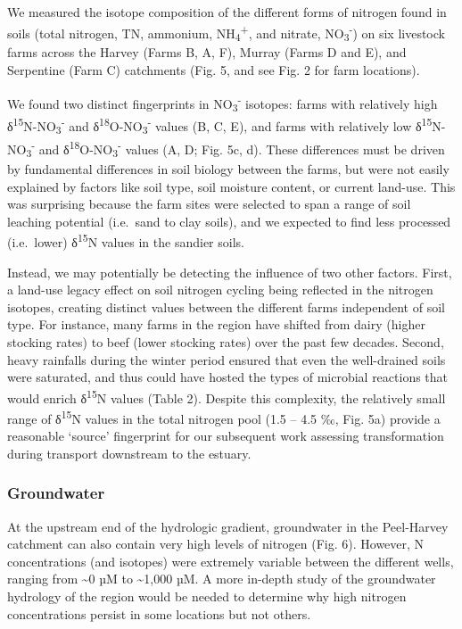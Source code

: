 \documentclass[
]{book}
\begin{document}
We measured the isotope composition of the different forms of nitrogen found in soils (total nitrogen, TN, ammonium, NH\textsubscript{4}\textsuperscript{+}, and nitrate, NO\textsubscript{3}\textsuperscript{-}) on six livestock farms across the Harvey (Farms B, A, F), Murray (Farms D and E), and Serpentine (Farm C) catchments (Fig. 5, and see Fig. 2 for farm locations).~

We found two distinct fingerprints in NO\textsubscript{3}\textsuperscript{-} isotopes: farms with relatively high δ\textsuperscript{15}N-NO\textsubscript{3}\textsuperscript{-} and δ\textsuperscript{18}O-NO\textsubscript{3}\textsuperscript{-} values (B, C, E), and farms with relatively low δ\textsuperscript{15}N-NO\textsubscript{3}\textsuperscript{-} and δ\textsuperscript{18}O-NO\textsubscript{3}\textsuperscript{-} values (A, D; Fig. 5c, d). These differences must be driven by fundamental differences in soil biology between the farms, but were not easily explained by factors like soil type, soil moisture content, or current land-use. This was surprising because the farm sites were selected to span a range of soil leaching potential (i.e.~sand to clay soils), and we expected to find less processed (i.e.~lower) δ\textsuperscript{15}N values in the sandier soils.~

Instead, we may potentially be detecting the influence of two other factors. First, a land-use legacy effect on soil nitrogen cycling being reflected in the nitrogen isotopes, creating distinct values between the different farms independent of soil type. For instance, many farms in the region have shifted from dairy (higher stocking rates) to beef (lower stocking rates) over the past few decades. Second, heavy rainfalls during the winter period ensured that even the well-drained soils were saturated, and thus could have hosted the types of microbial reactions that would enrich δ\textsuperscript{15}N values (Table 2). Despite this complexity, the relatively small range of δ\textsuperscript{15}N values in the total nitrogen pool (1.5 -- 4.5 ‰, Fig. 5a) provide a reasonable `source' fingerprint for our subsequent work assessing transformation during transport downstream to the estuary. ~

\hypertarget{groundwater}{%
\subsubsection{Groundwater}\label{groundwater}}

At the upstream end of the hydrologic gradient, groundwater in the Peel-Harvey catchment can also contain very high levels of nitrogen (Fig. 6). However, N concentrations (and isotopes) were extremely variable between the different wells, ranging from \textasciitilde0 µM to \textasciitilde1,000 µM. A more in-depth study of the groundwater hydrology of the region would be needed to determine why high nitrogen concentrations persist in some locations but not others.~
\end{document}
